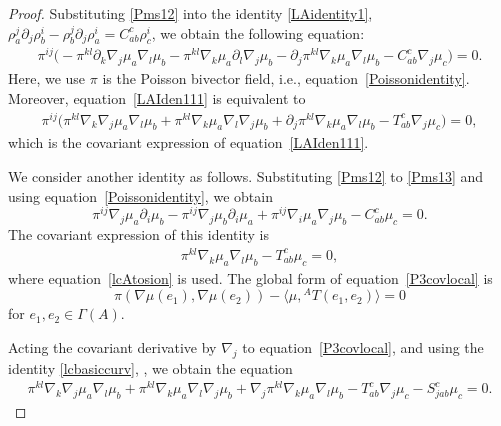 \documentclass[10pt,a4paper]{amsart}
\numberwithin{equation}{section}
\begin{document}
\begin{proof}
Substituting \eqref{Pms12} into the identity \eqref{LAidentity1},
$\rho_a^j \partial_j \rho_{b}^i - \rho_b^j \partial_j \rho_{a}^i = C_{ab}^c \rho_c^i$,
we obtain the following equation:
\begin{gather}
 \pi^{ij} \bigl(-\pi^{kl} \partial_k \nabla_j \mu_a \nabla_l \mu_b
- \pi^{kl} \nabla_k \mu_a \partial_l \nabla_j \mu_b
- \partial_j \pi^{kl} \nabla_k \mu_a \nabla_l \mu_b
- C_{ab}^c \nabla_j \mu_c\bigr)=0.
\label{LAIden111}
\end{gather}
Here, we use $\pi$ is the Poisson bivector field, i.e.,
equation~\eqref{Poissonidentity}.
Moreover, equation~\eqref{LAIden111} is equivalent to
\begin{gather}
\pi^{ij} \bigl(\pi^{kl} \nabla_k \nabla_j \mu_a \nabla_l \mu_b
+ \pi^{kl} \nabla_k \mu_a \nabla_l \nabla_j \mu_b
+ \partial_j \pi^{kl} \nabla_k \mu_a \nabla_l \mu_b
- T_{ab}^c \nabla_j \mu_c\bigr)=0,
\label{identity11}
\end{gather}
which is the covariant expression of equation~\eqref{LAIden111}.

We consider another identity as follows.
Substituting \eqref{Pms12} to \eqref{Pms13}
and using equation~\eqref{Poissonidentity},
we obtain
\[%
 \pi^{ij} \nabla_j \mu_a \partial_i \mu_b
- \pi^{ij} \nabla_j \mu_b \partial_i \mu_a
+ \pi^{ij} \nabla_i \mu_a \nabla_j \mu_b
- C_{ab}^c \mu_c=0.
\]
The covariant expression of this identity is
\begin{gather}
\pi^{kl} \nabla_k \mu_a \nabla_l \mu_b
- T_{ab}^c \mu_c=0,
\label{P3covlocal}
\end{gather}
where equation~\eqref{lcAtosion} is used.
The global form of equation~\eqref{P3covlocal} is
\[
\pi(\nabla \mu(e_1), \nabla \mu(e_2))
- \big\langle\mu,{}^A T(e_1, e_2)\big\rangle = 0
\]
for $e_1, e_2 \in \Gamma(A)$.

Acting the covariant derivative by $\nabla_j$ to equation~\eqref{P3covlocal},
and using the identity \eqref{lcbasiccurv},
,
we obtain the equation
\begin{gather}
 \pi^{kl} \nabla_k \nabla_j \mu_a \nabla_l \mu_b
+ \pi^{kl} \nabla_k \mu_a \nabla_l \nabla_j \mu_b
+ \nabla_j \pi^{kl} \nabla_k \mu_a \nabla_l \mu_b
- T_{ab}^c \nabla_j \mu_c
- S_{jab}^c \mu_c =0.
\label{identity12}
\end{gather}


\end{proof}
\end{document}
